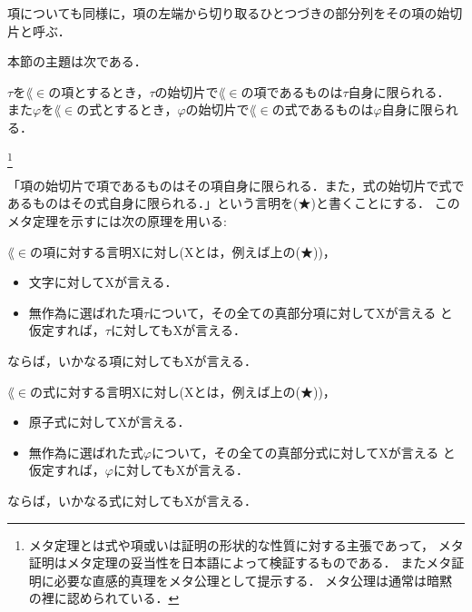 	項についても同様に，項の左端から切り取るひとつづきの部分列をその項の始切片と呼ぶ．
	
	本節の主題は次である．
	\begin{screen}
		\begin{metathm}[始切片の一意性]\label{metathm:initial_segment_L_in}
			$\tau$を$\lang{\in}$の項とするとき，$\tau$の始切片で$\lang{\in}$の項であるものは$\tau$自身に限られる．
			また$\varphi$を$\lang{\in}$の式とするとき，$\varphi$の始切片で$\lang{\in}$の式であるものは$\varphi$自身に限られる．
		\end{metathm}
	\end{screen}
	
	\footnote[0]{
		メタ定理とは式や項或いは証明の形状的な性質に対する主張であって，
		メタ証明はメタ定理の妥当性を日本語によって検証するものである．
		またメタ証明に必要な直感的真理をメタ公理として提示する．
		メタ公理は通常は暗黙の裡に認められている．
	}
	
	「項の始切片で項であるものはその項自身に限られる．また，式の始切片で式であるものはその式自身に限られる．」という言明を(★)と書くことにする．
	このメタ定理を示すには次の原理を用いる:
	
	\begin{screen}
		\begin{metaaxm}
			$\lang{\in}$の項に対する言明Xに対し(Xとは，例えば上の(★))，
			\begin{itemize}
				\item 文字に対してXが言える．
				\item 無作為に選ばれた項$\tau$について，その全ての真部分項に対してXが言える
					と仮定すれば，$\tau$に対してもXが言える．
			\end{itemize}
			ならば，いかなる項に対してもXが言える．
		\end{metaaxm}
	\end{screen}
	
	\begin{screen}
		\begin{metaaxm}
			$\lang{\in}$の式に対する言明Xに対し(Xとは，例えば上の(★))，
			\begin{itemize}
				\item 原子式に対してXが言える．
				\item 無作為に選ばれた式$\varphi$について，その全ての真部分式に対してXが言える
					と仮定すれば，$\varphi$に対してもXが言える．
			\end{itemize}
			ならば，いかなる式に対してもXが言える．
		\end{metaaxm}
	\end{screen}
	
